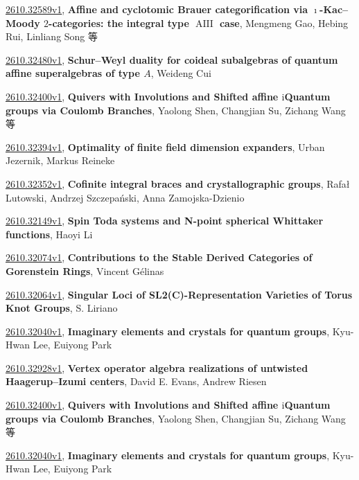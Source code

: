 \documentclass[9pt, a4paper]{article}
\theoremstyle{plain}
\theoremstyle{definition}
\theoremstyle{remark}
\newcommand{\arxiv}[3]{\href{https://arxiv.org/abs/#1}{#1}, \textbf{\textcolor{arxivblue}{#2}}, #3}
\begin{document}
\arxiv{2610.32589v1}{Affine and cyclotomic Brauer categorification via $\imath$-Kac--Moody $2$-categories: the integral type $\operatorname{AIII}$ case}{Mengmeng Gao, Hebing Rui, Linliang Song 等}

\arxiv{2610.32480v1}{Schur--Weyl duality for coideal subalgebras of quantum affine superalgebras of type $A$}{Weideng Cui}

\arxiv{2610.32400v1}{Quivers with Involutions and Shifted affine $\mathrm{i}$Quantum groups via Coulomb Branches}{Yaolong Shen, Changjian Su, Zichang Wang 等}

\arxiv{2610.32394v1}{Optimality of finite field dimension expanders}{Urban Jezernik, Markus Reineke}

\arxiv{2610.32352v1}{Cofinite integral braces and crystallographic groups}{Rafał Lutowski, Andrzej Szczepański, Anna Zamojska-Dzienio}

\arxiv{2610.32149v1}{Spin Toda systems and N-point spherical Whittaker functions}{Haoyi Li}

\arxiv{2610.32074v1}{Contributions to the Stable Derived Categories of Gorenstein Rings}{Vincent Gélinas}

\arxiv{2610.32064v1}{Singular Loci of SL2(C)-Representation Varieties of Torus Knot Groups}{S. Liriano}

\arxiv{2610.32040v1}{Imaginary elements and crystals for quantum groups}{Kyu-Hwan Lee, Euiyong Park}

\arxiv{2610.32928v1}{Vertex operator algebra realizations of untwisted Haagerup--Izumi centers}{David E. Evans, Andrew Riesen}

\arxiv{2610.32400v1}{Quivers with Involutions and Shifted affine $\mathrm{i}$Quantum groups via Coulomb Branches}{Yaolong Shen, Changjian Su, Zichang Wang 等}

\arxiv{2610.32040v1}{Imaginary elements and crystals for quantum groups}{Kyu-Hwan Lee, Euiyong Park}

\end{document}
